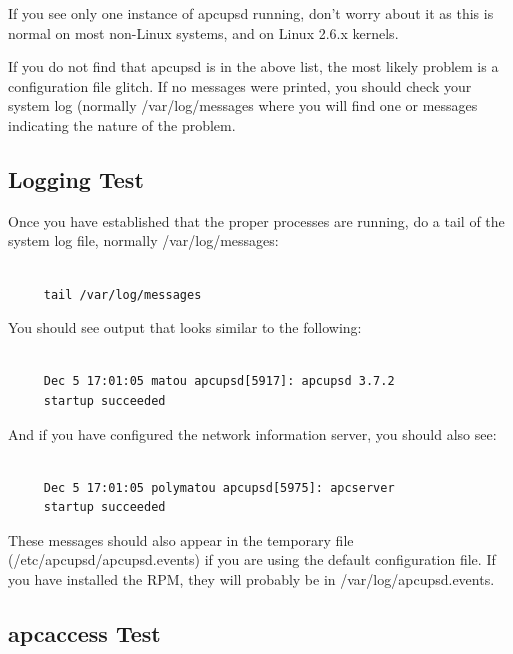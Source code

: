 {If you see only one instance of apcupsd running, don't worry about it as this
is normal on most non-Linux systems, and on Linux 2.6.x kernels.  

If you do not find that apcupsd is in the above list, the most likely problem
is a configuration file glitch.  If no messages were printed, you should check
your system log (normally /var/log/messages where you will find one or
messages indicating the nature of the problem. 

\label{Logging-Test}

\subsection*{Logging Test}

\label{index-Testing_002c-Logging-87}
\label{index-Logging_002c-Testing-88}
Once you have established that the proper processes are running, do a tail of
the system log file, normally /var/log/messages: 

\footnotesize
\begin{verbatim}
     
     tail /var/log/messages
\end{verbatim}
\normalsize

You should see output that looks similar to the following: 

\footnotesize
\begin{verbatim}
     
     Dec 5 17:01:05 matou apcupsd[5917]: apcupsd 3.7.2
     startup succeeded
\end{verbatim}
\normalsize

And if you have configured the network information server, you should also
see: 

\footnotesize
\begin{verbatim}
     
     Dec 5 17:01:05 polymatou apcupsd[5975]: apcserver
     startup succeeded
\end{verbatim}
\normalsize

These messages should also appear in the temporary file
(/etc/apcupsd/apcupsd.events) if you are using the default configuration file.
If you have installed the RPM, they will probably be in
/var/log/apcupsd.events. 

\label{apcaccess-Test}

\subsection*{apcaccess Test}

}
